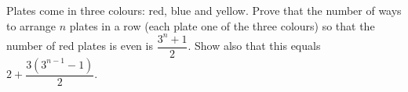 Plates come in three colours: red, blue and yellow. Prove that the number of ways to arrange $n$ plates in a row (each plate one of the three colours) so that the number of red plates is even is $\dfrac{3^n+1}{2}$. Show also that this equals $2+\dfrac{3\left(3^{n-1}-1\right)}{2}$.
